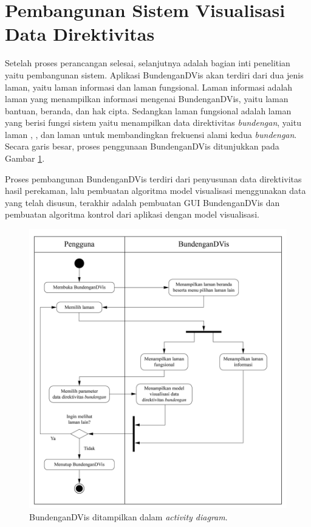 \section{Pembangunan Sistem Visualisasi Data Direktivitas \Bundengan}
Setelah proses perancangan selesai, selanjutnya adalah bagian inti penelitian yaitu pembangunan sistem. Aplikasi BundenganDVis akan terdiri dari dua jenis laman, yaitu laman informasi dan laman fungsional. Laman informasi adalah laman yang menampilkan informasi mengenai BundenganDVis, yaitu laman bantuan, beranda, dan hak cipta. Sedangkan laman fungsional adalah laman yang berisi fungsi sistem yaitu menampilkan data direktivitas \emph{bundengan}, yaitu laman , , dan laman untuk membandingkan frekuensi alami kedua \emph{bundengan}. Secara garis besar, proses penggunaan BundenganDVis ditunjukkan pada Gambar \ref{fig:act-diagram}. \par 

Proses pembangunan BundenganDVis terdiri dari penyusunan data direktivitas hasil perekaman, lalu pembuatan algoritma model visualisasi menggunakan data yang telah disusun, terakhir adalah pembuatan GUI BundenganDVis dan pembuatan algoritma kontrol dari aplikasi dengan model visualisasi. \par 

\begin{figure}[h!]
	\centering
	\includegraphics[width= 12.7cm]{Gambar/act-diagram.jpg}
	\caption{BundenganDVis ditampilkan dalam \emph{activity diagram}.}
	\label{fig:act-diagram}
\end{figure}

